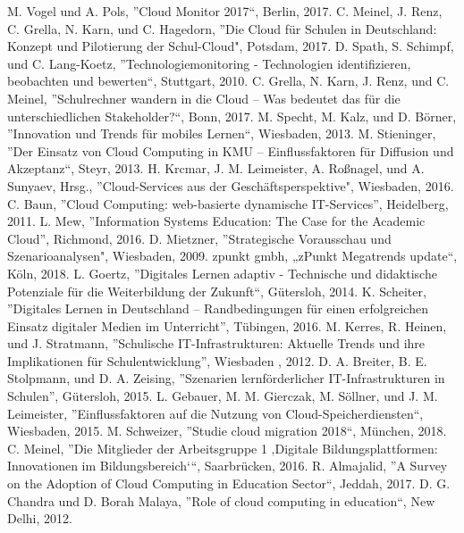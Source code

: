 \documentclass[conference]{IEEEtran}
\begin{document}
\begin{thebibliography}{00}
M. Vogel und A. Pols, ''Cloud Monitor 2017“, Berlin, 2017.
 C. Meinel, J. Renz, C. Grella, N. Karn, und C. Hagedorn, ''Die Cloud für Schulen in Deutschland: Konzept und Pilotierung der Schul-Cloud", Potsdam, 2017.
D. Spath, S. Schimpf, und C. Lang-Koetz, ''Technologiemonitoring - Technologien identifizieren, beobachten und bewerten“, Stuttgart, 2010.
 C. Grella, N. Karn, J. Renz, und C. Meinel, ''Schulrechner wandern in die Cloud – Was bedeutet das für die unterschiedlichen Stakeholder?“, Bonn, 2017.
 M. Specht, M. Kalz, und D. Börner, ''Innovation und Trends für mobiles Lernen“, Wiesbaden, 2013.
 M. Stieninger, ''Der Einsatz von Cloud Computing in KMU – Einflussfaktoren für Diffusion und Akzeptanz“, Steyr, 2013.
 H. Krcmar, J. M. Leimeister, A. Roßnagel, und A. Sunyaev, Hrsg., ''Cloud-Services aus der Geschäftsperspektive", Wiesbaden, 2016.
 C. Baun, ''Cloud Computing: web-basierte dynamische IT-Services'', Heidelberg, 2011.
 L. Mew, ''Information Systems Education: The Case for the Academic Cloud'', Richmond, 2016.
 D. Mietzner, ''Strategische Vorausschau und Szenarioanalysen", Wiesbaden, 2009.
zpunkt gmbh, „zPunkt Megatrends update“, Köln, 2018.
 L. Goertz, ''Digitales Lernen adaptiv - Technische und didaktische Potenziale für die Weiterbildung der Zukunft“, Gütersloh, 2014.
 K. Scheiter, ''Digitales Lernen in Deutschland – Randbedingungen für einen erfolgreichen Einsatz digitaler Medien im Unterricht'',  Tübingen, 2016.
 M. Kerres, R. Heinen, und J. Stratmann, ''Schulische IT-Infrastrukturen: Aktuelle Trends und ihre Implikationen für Schulentwicklung'',  Wiesbaden , 2012.
 D. A. Breiter, B. E. Stolpmann, und D. A. Zeising, ''Szenarien lernförderlicher IT-Infrastrukturen in Schulen'', Gütersloh, 2015.
 L. Gebauer, M. M. Gierczak, M. Söllner, und J. M. Leimeister, ''Einflussfaktoren auf die Nutzung von Cloud-Speicherdiensten“, Wiesbaden, 2015.
 M. Schweizer, ''Studie cloud migration 2018“, München, 2018.
 C. Meinel, ''Die Mitglieder der Arbeitsgruppe 1 ‚Digitale Bildungsplattformen: Innovationen im Bildungsbereich‘“, Saarbrücken, 2016.
 R. Almajalid, ''A Survey on the Adoption of Cloud Computing in Education Sector“, Jeddah, 2017.
 D. G. Chandra und D. Borah Malaya, ''Role of cloud computing in education“, New Delhi, 2012.

\end{thebibliography}
\end{document}
